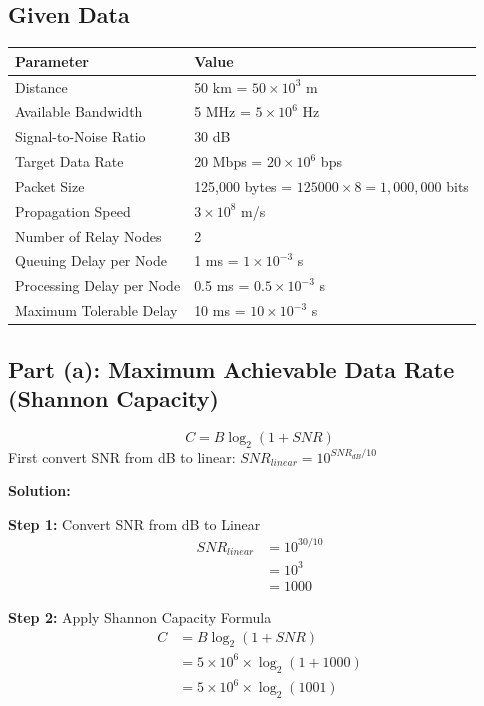 \documentclass[12pt,a4paper]{article}
\begin{document}
\subsection{Given Data}

\begin{table}[h]
\centering
\begin{tabular}{ll}
\toprule
\textbf{Parameter} & \textbf{Value} \\
\midrule
Distance & 50 km = $50 \times 10^3$ m \\
Available Bandwidth & 5 MHz = $5 \times 10^6$ Hz \\
Signal-to-Noise Ratio & 30 dB \\
Target Data Rate & 20 Mbps = $20 \times 10^6$ bps \\
Packet Size & 125,000 bytes = $125000 \times 8 = 1,000,000$ bits \\
Propagation Speed & $3 \times 10^8$ m/s \\
Number of Relay Nodes & 2 \\
Queuing Delay per Node & 1 ms = $1 \times 10^{-3}$ s \\
Processing Delay per Node & 0.5 ms = $0.5 \times 10^{-3}$ s \\
Maximum Tolerable Delay & 10 ms = $10 \times 10^{-3}$ s \\
\bottomrule
\end{tabular}
\end{table}

\subsection{Part (a): Maximum Achievable Data Rate (Shannon Capacity)}

\begin{formulabox}
\[C = B \log_2(1 + SNR)\]
First convert SNR from dB to linear: $SNR_{linear} = 10^{SNR_{dB}/10}$
\end{formulabox}

\textbf{Solution:}

\textbf{Step 1:} Convert SNR from dB to Linear
\begin{align*}
SNR_{linear} &= 10^{30/10} \\[1em]
&= 10^3 \\[1em]
&= 1000
\end{align*}

\textbf{Step 2:} Apply Shannon Capacity Formula
\begin{align*}
C &= B \log_2(1 + SNR) \\[1em]
&= 5 \times 10^6 \times \log_2(1 + 1000) \\[1em]
&= 5 \times 10^6 \times \log_2(1001)
\end{align*}
\end{document}
